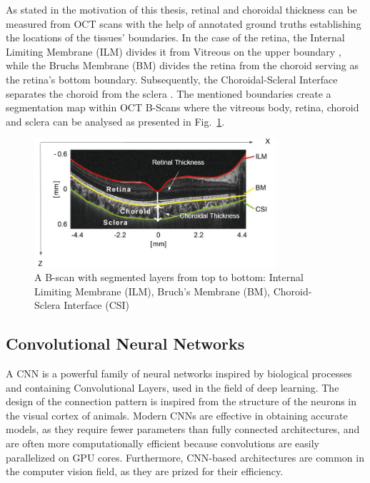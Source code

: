 \documentclass[12pt,a4paper]{scrartcl}
\begin{document}
As stated in the motivation of this thesis, retinal and choroidal thickness can be measured from OCT scans with the help of annotated ground truths establishing the locations of the tissues' boundaries. In the case of the retina, the Internal Limiting Membrane (ILM) divides it from Vitreous on the upper boundary \cite{MACNAIR2015343}, while the Bruchs Membrane (BM) divides the retina from the choroid \cite{BOOIJ20101} serving as the retina's bottom boundary. Subsequently, the Choroidal-Scleral Interface separates the choroid from the sclera \cite{Ronchetti2018}. The mentioned boundaries create a segmentation map within OCT B-Scans where the vitreous body, retina, choroid and sclera can be analysed as presented in Fig.~\ref{fig:annotated-oct-scan}. 


\begin{figure}[H]
    \centering
    \includegraphics[width=0.8\textwidth]{./images/OCT-Scan.png}
    \caption{A B-scan with segmented layers from top to bottom:  Internal Limiting Membrane (ILM),  Bruch's Membrane (BM), Choroid-Sclera Interface (CSI) \cite{Ronchetti2019}}
    \label{fig:annotated-oct-scan}
\end{figure}

\subsection{Convolutional Neural Networks}\label{s:cnn}

A CNN is a powerful family of neural networks inspired by biological processes and containing Convolutional Layers, used in the field of deep learning. The design of the connection pattern is inspired from the structure of the neurons in the visual cortex of animals. Modern CNNs are effective in obtaining accurate models, as they require fewer parameters than fully connected architectures, and are often more computationally efficient because convolutions are easily parallelized on GPU cores\cite{DIDLBook}. Furthermore, CNN-based architectures are common in the computer vision field, as they are prized for their efficiency. 
\end{document}
